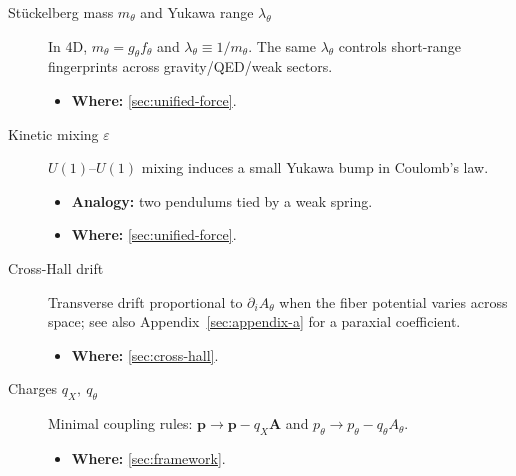\begin{description}
  \item[St\"uckelberg mass $m_\theta$ and Yukawa range $\lambda_\theta$] In 4D, $m_\theta=g_\theta f_\theta$ and $\lambda_\theta\equiv 1/m_\theta$. The same $\lambda_\theta$ controls short-range fingerprints across gravity/QED/weak sectors.
  \begin{itemize}
    \item \textbf{Where:} \cref{sec:unified-force}.
  \end{itemize}

  \item[Kinetic mixing $\varepsilon$] $U(1)$--$U(1)$ mixing induces a small Yukawa bump in Coulomb's law.
  \begin{itemize}
    \item \textbf{Analogy:} two pendulums tied by a weak spring.
    \item \textbf{Where:} \cref{sec:unified-force}.
  \end{itemize}

  \item[Cross-Hall drift] Transverse drift proportional to $\partial_i A_\theta$ when the fiber potential varies across space; see also Appendix~\ref{sec:appendix-a} for a paraxial coefficient.
  \begin{itemize}
    \item \textbf{Where:} \cref{sec:cross-hall}.
  \end{itemize}

  \item[Charges $q_X,\ q_\theta$] Minimal coupling rules: $\mathbf p\to\mathbf p-q_X\mathbf A$ and $p_\theta\to p_\theta-q_\theta A_\theta$.
  \begin{itemize}
    \item \textbf{Where:} \cref{sec:framework}.
  \end{itemize}
\end{description}
